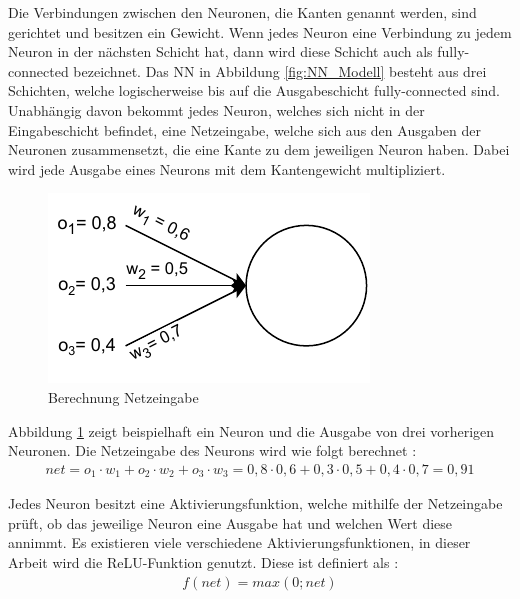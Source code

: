 Die Verbindungen zwischen den Neuronen, die Kanten genannt werden, sind gerichtet und besitzen ein Gewicht. Wenn jedes Neuron eine Verbindung zu jedem Neuron in der nächsten Schicht hat, 
dann wird diese Schicht auch als fully-connected bezeichnet. Das \ac{NN} in Abbildung \ref*{fig:NN_Modell} besteht aus drei Schichten, welche logischerweise bis auf die Ausgabeschicht 
fully-connected sind. Unabhängig davon bekommt jedes Neuron, welches sich nicht in der Eingabeschicht befindet, eine Netzeingabe, welche sich aus den Ausgaben der Neuronen zusammensetzt, 
die eine Kante zu dem jeweiligen Neuron haben. Dabei wird jede Ausgabe eines Neurons mit dem Kantengewicht multipliziert.

\begin{figure}[H]
    \centering
    \includegraphics[width=\textwidth/2]{abbildungen/Aktivierungsfunktion.pdf}
    \caption{Berechnung Netzeingabe \cite[vgl. S.29]{NN}}
    \label{fig:Aktivierungsfunktion}
\end{figure}

Abbildung \ref*{fig:Aktivierungsfunktion} zeigt beispielhaft ein Neuron und die Ausgabe von drei vorherigen Neuronen. Die Netzeingabe des Neurons wird wie folgt berechnet \cite[S.29]{NN}:
\begin{align}
    net = o_{1} \cdot w_{1} + o_{2} \cdot w_{2} + o_{3} \cdot w_{3} = 0,8 \cdot 0,6 + 0,3 \cdot 0,5 + 0,4 \cdot 0,7 = 0,91
\end{align}

Jedes Neuron besitzt eine Aktivierungsfunktion, welche mithilfe der Netzeingabe prüft, ob das jeweilige Neuron eine Ausgabe hat und welchen Wert diese annimmt. Es existieren viele
verschiedene Aktivierungsfunktionen, in dieser Arbeit wird die \ac{ReLU}-Funktion genutzt. Diese ist definiert als \cite[S.31]{NN}:
\begin{align}
    f(net) = max(0; net)
\end{align}


